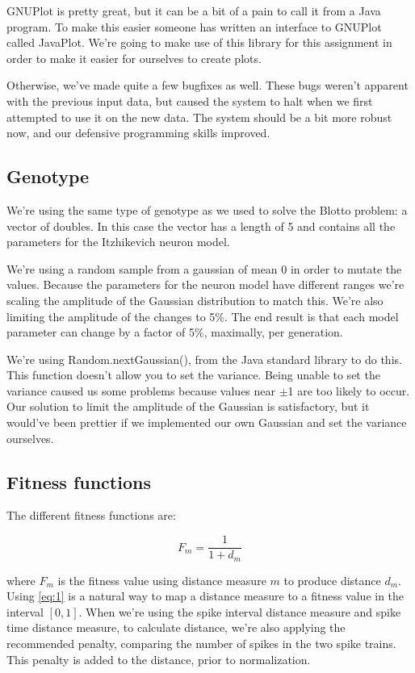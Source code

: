 \documentclass[a4paper]{article}
\begin{document}
GNUPlot is pretty great, but it can be a bit of a pain to call it from a Java program. To make this easier someone has written an interface to GNUPlot called JavaPlot. We're going to make use of this library for this assignment in order to make it easier for ourselves to create plots.

Otherwise, we've made quite a few bugfixes as well. These bugs weren't apparent with the previous input data, but caused the system to halt when we first attempted to use it on the new data. The system should be a bit more robust now, and our defensive programming skills improved.

\subsection{Genotype}
\label{sec:genotype}

We're using the same type of genotype as we used to solve the Blotto problem: a vector of doubles. In this case the vector has a length of 5 and contains all the parameters for the Itzhikevich neuron model.

We're using a random sample from a gaussian of mean 0 in order to mutate the values. Because the parameters for the neuron model have different ranges we're scaling the amplitude of the Gaussian distribution to match this. We're also limiting the amplitude of the changes to 5\%. The end result is that each model parameter can change by a factor of 5\%, maximally, per generation.

We're using Random.nextGaussian(), from the Java standard library to do this. This function doesn't allow you to set the variance. Being unable to set the variance caused us some problems because values near $\pm$1 are too likely to occur. Our solution to limit the amplitude of the Gaussian is satisfactory, but it would've been prettier if we implemented our own Gaussian and set the variance ourselves.

\subsection{Fitness functions}
\label{sec:fitfuncs}

The different fitness functions are:

\begin{equation}
  \label{eq:1}
  F_m = \frac{1}{1+d_m}
\end{equation}

\noindent where $F_m$ is the fitness value using distance measure $m$ to produce distance $d_m$. Using \eqref{eq:1} is a natural way to map a distance measure to a fitness value in the interval $[0,1]$. When we're using the spike interval distance measure and spike time distance measure, to calculate distance, we're also applying the recommended penalty, comparing the number of spikes in the two spike trains. This penalty is added to the distance, prior to normalization.
\end{document}
